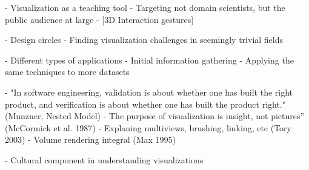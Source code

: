 - Visualization as a teaching tool
 - Targeting not domain scientists, but the public audience at large
 - [3D Interaction gestures]

- Design circles
- Finding visualization challenges in seemingly trivial fields

- Different types of applications
  - Initial information gathering
  - Applying the same techniques to more datasets

- "In software engineering, validation is about whether one has built the right product, and verification is about whether one has built the product right." (Munzner, Nested Model)
- The purpose of visualization is insight, not pictures” (McCormick et al. 1987)
- Explaning multiviews, brushing, linking, etc (Tory 2003)
- Volume rendering integral  (Max 1995)

- Cultural component in understanding visualizations